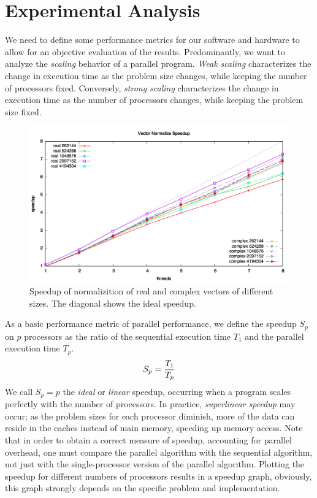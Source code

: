 \documentclass[a4paper,11pt, oneside]{report}
\newcommand{\concept}[1]{\emph{#1}}
\begin{document}
\section{Experimental Analysis}
We need to define some performance metrics for our software and hardware to allow for an objective evaluation of the results. Predominantly, we want to analyze the \concept{scaling} behavior of a parallel program. \concept{Weak scaling} characterizes the change in execution time as the problem size changes, while keeping the number of processors fixed. Conversely, \concept{strong scaling} characterizes the change in execution time as the number of processors changes, while keeping the problem size fixed.

\begin{figure}[hbp]
	\centering
	\hspace*{-0.07\columnwidth}
	\includegraphics[width=1.09\columnwidth]{normalize.png}
	\caption{Speedup of normalizition of real and complex vectors of different sizes. The diagonal shows the ideal speedup.} \label{fig:normalize}
\end{figure}

 As a basic performance metric of parallel performance, we define the speedup $S_p$ on $p$ processors as the ratio of the sequential execution time $T_1$ and the parallel execution time $T_p$.
\begin{equation}
S_p = {T_1 \over T_p}
\end{equation}
We call $S_p = p$ the \concept{ideal} or \concept{linear} speedup, occurring when a program scales perfectly with the number of processors. In practice, \concept{superlinear speedup} may occur; as the problem sizes for each processor diminish, more of the data can reside in the caches instead of main memory, speeding up memory access\cite{snyder-lin}. Note that in order to obtain a correct measure of speedup, accounting for parallel overhead, one must compare the parallel algorithm with the sequential algorithm, not just with the single-processor version of the parallel algorithm.
Plotting the speedup for different numbers of processors results in a speedup graph, obviously, this graph strongly depends on the specific problem and implementation.
\end{document}
